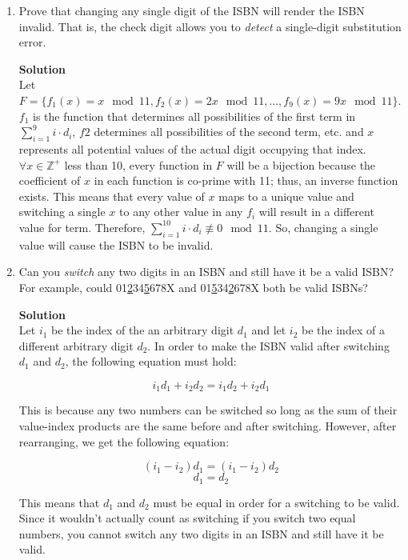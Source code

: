 \documentclass[11pt]{article}
\newenvironment{Parts}{\begin{enumerate}[label=(\alph*)]}{\end{enumerate}}
\newcommand*{\Part}{\item}
\newenvironment{Answer}{\vspace{10pt}\begin{mdframed}\textbf{Solution}\\}{\end{mdframed}\vfill\pagebreak[3]}
\newenvironment{Answer}{\vspace{10pt}}{\vfill\pagebreak[3]}
\newcommand*{\Z}{\mathbb{Z}}
\begin{document}
\begin{Parts}
\begin{Answer}
	\end{Answer}
	\Part Prove that changing any single digit of the ISBN will render the ISBN invalid. That is, the check digit allows you to \textit{detect} a single-digit substitution error. \\
	\begin{Answer}
		Let $F=\{f_1(x)=x \mod 11, f_2(x)=2x \mod 11,...,f_9(x)=9x \mod 11\}$. $f_1$ is the function that determines all possibilities of the first term in $\sum_{i=1}^{9} i\cdot d_i$, $f2$ determines all possibilities of the second term, etc. and $x$ represents all potential values of the actual digit occupying that index.  $\forall x \in \Z^+$ less than 10, every function in $F$ will be a bijection because the coefficient of $x$ in each function is co-prime with 11; thus, an inverse function exists. This means that every value of $x$ maps to a unique value and switching a single $x$ to any other value in any $f_i$ will result in a different value for term. Therefore, $\sum_{i=1}^{10} i\cdot d_i \not\equiv 0 \mod 11$. So, changing a single value will cause the ISBN to be invalid. 
	\end{Answer}
	\Part Can you \textit{switch} any two digits in an ISBN and still have it be a valid ISBN? For example, could 01\underline{2}34\underline{5}678X and 01\underline{5}34\underline{2}678X both be valid ISBNs? \\
	\begin{Answer}
		Let $i_1$ be the index of the an arbitrary digit $d_1$ and let $i_2$ be the index of a different arbitrary digit $d_2$. In order to make the ISBN valid after switching $d_1$ and $d_2$, the following equation must hold:
		
		$$i_1d_1+i_2d_2=i_1d_2+i_2d_1$$
		
		This is because any two numbers can be switched so long as the sum of their value-index products are the same before and after switching. However, after rearranging, we get the following equation:
		
		$$(i_1-i_2)d_1=(i_1-i_2)d_2$$
		$$d_1=d_2$$
		
		This means that $d_1$ and $d_2$ must be equal in order for a switching to be valid. Since it wouldn't actually count as switching if you switch two equal numbers, you cannot switch any two digits in an ISBN and still have it be valid.
	\end{Answer}
		
\end{Parts}




\end{document}
